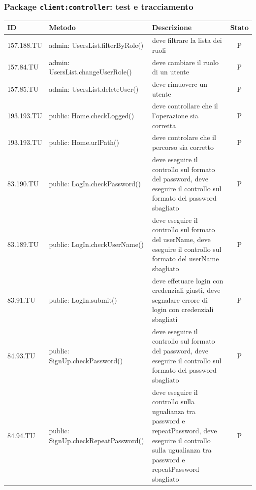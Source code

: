 \documentclass[12pt,a4paper]{article}
\begin{document}
\subsubsection{Package \texttt{client:controller}: test e tracciamento}
\begin{center}
	\begin{longtable}[H]{l p{} p{} c}\midrule
	\textbf{ID} & \textbf{Metodo} & \textbf{Descrizione} & \textbf{Stato}\\
	\midrule
	\midrule
	157.188.TU& admin: \newline  UsersList.filterByRole() & deve filtrare la lista dei ruoli& P \\ 
	\midrule
	157.84.TU& admin: \newline  UsersList.changeUserRole() & deve cambiare il ruolo di un utente & P\\ \midrule
	157.85.TU& admin: \newline  UsersList.deleteUser() & deve rimuovere un utente & P\\ \midrule
	193.193.TU& public: \newline  Home.checkLogged() & deve controllare che il l'operazione sia corretta& P\\ \midrule
	193.193.TU& public: \newline  Home.urlPath() & deve controlare che il percorso sia corretto & P\\ \midrule
	83.190.TU& public: \newline  LogIn.checkPassword() & deve eseguire il controllo sul formato del password, deve eseguire il controllo sul formato del password sbagliato& P \\ \midrule
	83.189.TU& public: \newline  LogIn.checkUserName() & deve eseguire il controllo sul formato del userName, deve eseguire il controllo sul formato del userName sbagliato & P\\ \midrule
	83.91.TU& public: \newline  LogIn.submit() & deve effetuare login con credenziali giusti, deve segnalare errore di login con credenziali sbagliati& P \\ \midrule
	84.93.TU & public: \newline  SignUp.checkPassword() & deve eseguire il controllo sul formato del password, deve eseguire il controllo sul formato del password sbagliato & P\\ \midrule
	84.94.TU & public: \newline  SignUp.checkRepeatPassword() & deve eseguire il controllo sulla ugualianza tra password e repeatPassword, deve eseguire il controllo sulla ugualianza tra password e repeatPassword sbagliato & P\\ \midrule

\end{longtable}
\end{center}
\end{document}
